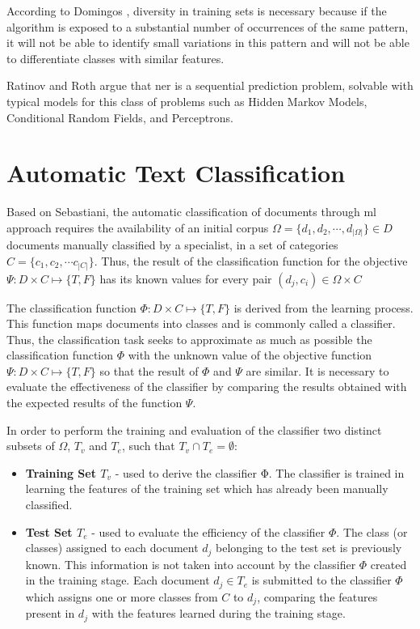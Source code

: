 According to Domingos \cite{domingos2012few}, diversity in training sets is necessary because if the algorithm is exposed to a substantial number of occurrences of the same pattern, it will not be able to identify small variations in this pattern and will not be able to differentiate classes with similar features.

Ratinov and Roth \cite{Ratinov:2009} argue that \gls{ner} is a sequential prediction problem, solvable with typical models for this class of problems such as Hidden Markov Models, Conditional Random Fields, and Perceptrons.



\section{\hspace*{3pt}Automatic Text Classification}

Based on Sebastiani\cite{Sebastiani:2002}, the automatic classification of documents through \gls{ml} approach requires the availability of an initial corpus  $\Omega=\{d_1,d_2, \cdots, d_{|\Omega|}\} \in D$ documents manually classified by a specialist, in a set of categories $C =\{c_1, c_2,\cdots c_{|C|}\}$. Thus, the result of the classification function for the objective $\Psi: D × C \mapsto \{T, F\}$ has its known values for every pair $(d_j, c_i) \in \Omega × C$

The classification function $\Phi: D × C \mapsto \{T, F\}$ is derived from the learning process. This function maps documents into classes and is commonly called a classifier. Thus, the classification task seeks to approximate as much as possible the classification function $\Phi$ with the unknown value of the objective function $\Psi: D × C \mapsto \{T, F\}$ so that the result of $\Phi$ and $\Psi$ are similar. It is necessary to evaluate the effectiveness of the classifier by comparing the results obtained with the expected results of the function $\Psi$.

In order to perform the training and evaluation of the classifier two distinct subsets of $\Omega$, $T_v$ and $T_e$, such that $T_v \cap T_e = \emptyset$:



\begin{itemize}
\item \textbf{Training Set $T_v$} - used to derive the classifier Φ. The classifier is trained in learning the features of the training set which has already been manually classified.


\item \textbf{Test Set $T_e$} - used to evaluate the efficiency of the classifier $\Phi$. The class (or classes) assigned to each document $d_j$ belonging to the test set is previously known. This information is not taken into account by the classifier $\Phi$ created in the training stage. Each document $d_j  \in T_e$  is submitted to the classifier $\Phi$ which assigns one or more classes from $C$ to $d_j$, comparing the features present in $d_j$ with the features learned during the training stage.
\end{itemize}


